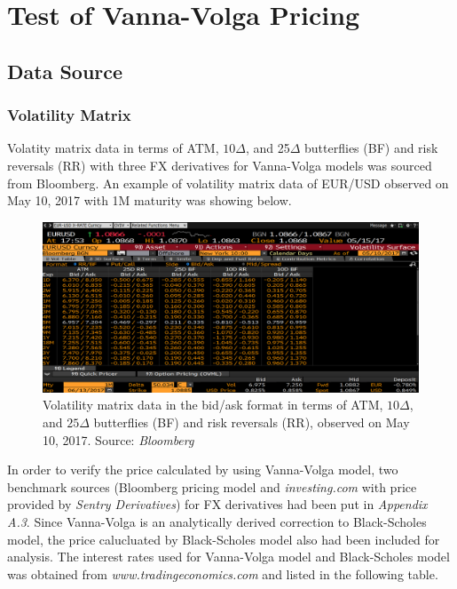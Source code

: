 \chapter{Test of Vanna-Volga Pricing}


\section{Data Source}
\subsection{Volatility Matrix}
Volatity matrix data in terms of ATM, $10\Delta$, and 25$\Delta$ butterflies (BF) and risk reversals (RR) with three FX derivatives for Vanna-Volga models was sourced from Bloomberg. An example of volatility matrix data of EUR/USD observed on May 10, 2017 with 1M maturity was showing below.

\begin{figure}[htb]
	\centering
	\includegraphics[scale=0.3]{./Testing-data/VolMatrix/EURUSD_1M_vol.png} 
	\caption{Volatility matrix data in the bid/ask format in terms of ATM, $10\Delta$, and $25\Delta$ butterflies (BF) and risk reversals (RR), observed on May 10, 2017. Source: \textit{Bloomberg}}
	\label{fig:label} %
\end{figure}
\noindent
In order to verify the price calculated by using Vanna-Volga model, two benchmark sources (Bloomberg pricing model and \textit{investing.com} with price provided by \textit{Sentry Derivatives}) for FX derivatives had been put in \textit{Appendix A.3}. Since Vanna-Volga is an analytically derived correction to Black-Scholes model, the price calucluated by Black-Scholes model also had been included for analysis.
\newline
\newline
The interest rates used for Vanna-Volga model and Black-Scholes model was obtained from \textit{www.tradingeconomics.com} and listed in the following table.

